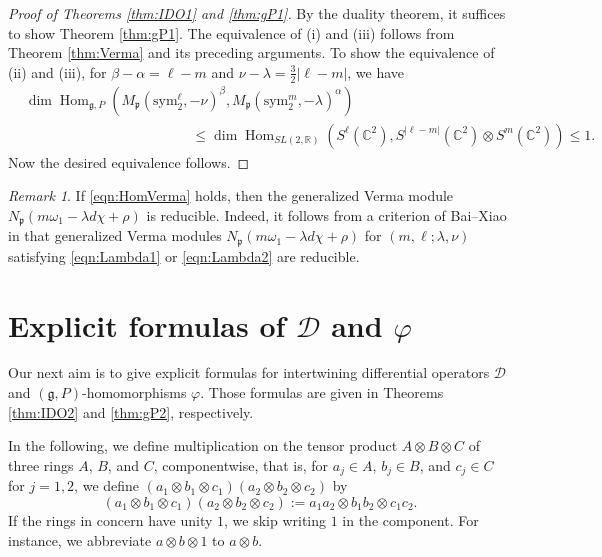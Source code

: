 \documentclass[reqno,11pt]{amsart}
\theoremstyle{remark}
\newtheorem{rem}[equation]{Remark}
\numberwithin{equation}{section}
\newcommand{\gb}{\beta}
\newcommand{\ga}{\alpha}
\newcommand{\fg}{{\mathfrak g}}
\newcommand{\fp}{{\mathfrak p}}
\newcommand{\R}{\mathbb{R}}
\newcommand{\C}{\mathbb{C}}
\newcommand{\Cal}{\mathcal}
\newcommand{\Hom}{\operatorname{Hom}}
\newcommand{\sym}{\mathrm{sym}}
\newcommand{\D}{\Cal{D}}
\begin{document}
\begin{proof}[Proof of Theorems \ref{thm:IDO1} and \ref{thm:gP1}]
By the duality theorem, it suffices to show Theorem \ref{thm:gP1}.
The equivalence of (i) and (iii) follows from Theorem \ref{thm:Verma} 
and its preceding arguments.
To show the equivalence of (ii) and (iii), 
for $\gb-\ga=\ell-m$ and $\nu-\lambda =\frac{3}{2}|\ell-m|$,
we have 
\begin{align*}
&\dim \Hom_{\fg, P}(M_\fp(\sym_2^\ell,-\nu)^\gb, M_\fp(\sym_2^m, -\lambda)^\ga) \\
&\hspace{5cm}
\leq 
\dim \Hom_{SL(2,\R)}(S^\ell(\C^2), S^{|\ell-m|}(\C^2)\otimes S^m(\C^2)) \leq 1.
\end{align*}
Now the desired equivalence follows.
\end{proof}


\begin{rem}
If \eqref{eqn:HomVerma} holds, then the generalized Verma module
$N_\fp(m\omega_1 -\lambda d\chi+\rho)$ is reducible.
Indeed, it follows from a criterion of Bai--Xiao in \cite[Thm.\ 5.1]{BX21}
that generalized Verma modules $N_\fp(m\omega_1 -\lambda d\chi+\rho)$
for $(m,\ell; \lambda,\nu)$ satisfying \eqref{eqn:Lambda1} or 
\eqref{eqn:Lambda2} are reducible.
\end{rem}

\section{Explicit formulas of $\D$ and $\varphi$}
\label{sec:construction}


Our next aim is to give explicit formulas for intertwining differential operators
$\D$ and $(\fg, P)$-homomorphisms $\varphi$.
Those formulas are given in Theorems \ref{thm:IDO2} and \ref{thm:gP2}, respectively.


In the following,  we define
multiplication on the tensor product $A \otimes B \otimes C$
of three rings $A$, $B$, and $C$, componentwise, that is,
for $a_j \in A$, $b_j \in B$, and $c_j \in C$ for $j=1,2$, we define
$(a_1\otimes b_1 \otimes c_1)(a_2 \otimes b_2\otimes c_2)$ by
\begin{equation*}
(a_1\otimes b_1 \otimes c_1)(a_2 \otimes b_2\otimes c_2) := 
a_1a_2 \otimes b_1 b_2 \otimes c_1c_2.
\end{equation*}
If the rings in concern have unity $1$, we skip writing $1$ in the component.
For instance, we abbreviate $a \otimes b \otimes 1$ to $a \otimes b$. 
\end{document}

